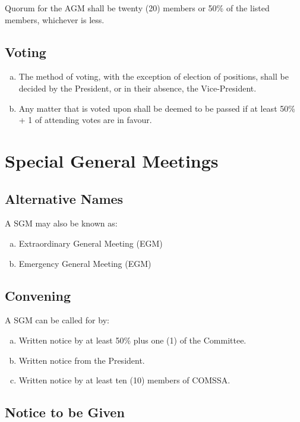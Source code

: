 \documentclass[a4paper,12pt]{article}
\begin{document}
Quorum for the AGM shall be twenty (20) members or 50\% of the listed members, whichever is less.

\subsection{Voting}

\begin{enumerate}[a)]
	\item The method of voting, with the exception of election of positions, shall be decided by the President, or in their absence, the Vice-President.
	\item Any matter that is voted upon shall be deemed to be passed if at least 50\% + 1 of attending votes are in favour.
\end{enumerate}

\section{Special General Meetings}

\subsection{Alternative Names}

A SGM may also be known as:

\begin{enumerate}[a)]
	\item Extraordinary General Meeting (EGM)
	\item Emergency General Meeting (EGM)
\end{enumerate}

\subsection{Convening}

A SGM can be called for by:

\begin{enumerate}[a)]
	\item Written notice by at least 50\% plus one (1) of the Committee.
	\item Written notice from the President.
	\item Written notice by at least ten (10) members of COMSSA.
\end{enumerate}

\subsection{Notice to be Given}
\end{document}
